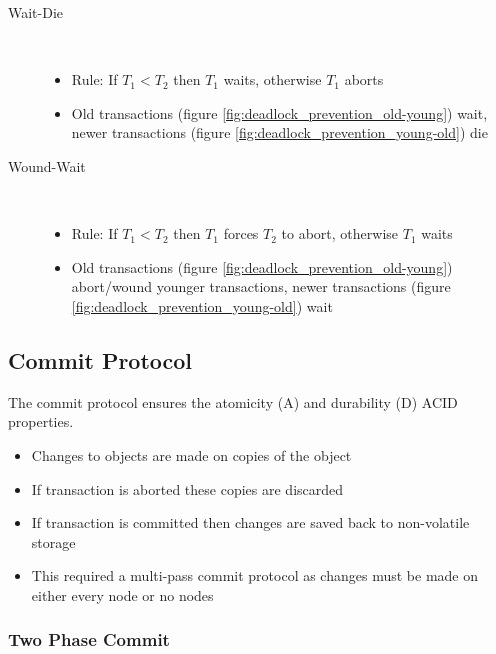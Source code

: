 \documentclass[a4paper]{article}
\begin{document}
\begin{description}
  \item[Wait-Die] \hfill \\
    \begin{itemize}
      \item Rule: If $T_{1} < T_{2}$ then $T_{1}$ waits, otherwise $T_{1}$
            aborts
      \item Old transactions (figure \ref{fig:deadlock_prevention_old-young})
            wait, newer transactions (figure
            \ref{fig:deadlock_prevention_young-old}) die
    \end{itemize}

  \item[Wound-Wait] \hfill \\
    \begin{itemize}
      \item Rule: If $T_{1} < T_{2}$ then $T_{1}$ forces $T_{2}$ to abort,
            otherwise $T_{1}$ waits
      \item Old transactions (figure \ref{fig:deadlock_prevention_old-young})
            abort/wound younger transactions, newer transactions (figure
            \ref{fig:deadlock_prevention_young-old}) wait
    \end{itemize}

\end{description}

\subsection{Commit Protocol}

The commit protocol ensures the atomicity (A) and durability (D) ACID
properties.

\begin{itemize}
  \item Changes to objects are made on copies of the object
  \item If transaction is aborted these copies are discarded
  \item If transaction is committed then changes are saved back to non-volatile
        storage
  \item This required a multi-pass commit protocol as changes must be made on
        either every node or no nodes
\end{itemize}

\subsubsection{Two Phase Commit}
\end{document}
